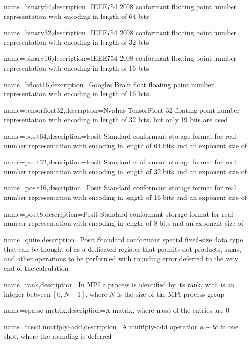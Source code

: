 
    {name=binary64,description={IEEE754 2008 \cite{ieee754_2008} conformant floating point number representation with encoding in length of \num{64} bits}}

    {name=binary32,description={IEEE754 2008 \cite{ieee754_2008} conformant floating point number representation with encoding in length of \num{32} bits}}

    {name=binary16,description={IEEE754 2008 \cite{ieee754_2008} conformant floating point number representation with encoding in length of \num{16} bits}}

    {name=bfloat16,description={Googles Brain float \cite{bfloat16} floating point number representation with encoding in length of \num{16} bits}}

    {name=tensorfloat32,description={Nvidias TensorFloat-32 \cite{tf32} floating point number representation with encoding in length of \num{32} bits, but only \num{19} bits are used}}

    {name=posit64,description={Posit Standard \cite{posit2018standard} conformant storage format for real number representation with encoding in length of \num{64} bits and an exponent size of }}

    {name=posit32,description={Posit Standard \cite{posit2018standard} conformant storage format for real number representation with encoding in length of \num{32} bits and an exponent size of }}

    {name=posit16,description={Posit Standard \cite{posit2018standard} conformant storage format for real number representation with encoding in length of \num{16} bits and an exponent size of }}

    {name=posit8,description={Posit Standard \cite{posit2018standard} conformant storage format for real number representation with encoding in length of \num{8} bits and an exponent size of }}

    {name=quire,description={Posit Standard \cite{posit2018standard} conformant special fixed-size data type that can be thought of as a dedicated register that permits dot products, sums, and other operations to be performed with rounding error deferred to the very end of the calculation \cite{gustafson2017posit}}}

    {name=rank,description={In \acrshort{MPI} a process is identified by its rank, with is an integer between $[0, N-1]$, where $N$ is the size of the MPI process group}}

    {name=sparse matrix,description={A matrix, where most of the entries are \num{0}}}

    {name=fused multiply–add,description={A multiply-add operation $a + bc$ in one shot, where the rounding is deferred}}
